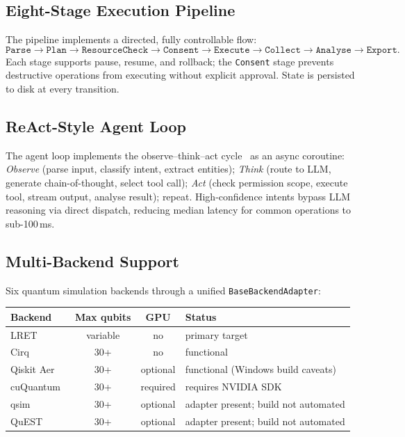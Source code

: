\documentclass[11pt,a4paper]{article}
\begin{document}
\subsection{Eight-Stage Execution Pipeline}

The pipeline implements a directed, fully controllable flow:
\[
\texttt{Parse} \to \texttt{Plan} \to \texttt{ResourceCheck} \to \texttt{Consent}
\to \texttt{Execute} \to \texttt{Collect} \to \texttt{Analyse} \to \texttt{Export}.
\]
Each stage supports pause, resume, and rollback; the \texttt{Consent} stage prevents
destructive operations from executing without explicit approval. State is persisted
to disk at every transition.

\subsection{ReAct-Style Agent Loop}

The agent loop implements the observe--think--act cycle~\cite{yao2023react} as an
async coroutine: \emph{Observe} (parse input, classify intent, extract entities);
\emph{Think} (route to LLM, generate chain-of-thought, select tool call);
\emph{Act} (check permission scope, execute tool, stream output, analyse result);
repeat. High-confidence intents bypass LLM reasoning via direct dispatch, reducing
median latency for common operations to sub-100\,ms.

\subsection{Multi-Backend Support}

Six quantum simulation backends through a unified \texttt{BaseBackendAdapter}:

\begin{center}
\renewcommand{\arraystretch}{1.2}
\begin{tabular}{@{}lccl@{}}
\toprule
\textbf{Backend} & \textbf{Max qubits} & \textbf{GPU} & \textbf{Status} \\
\midrule
LRET              & variable & no       & primary target \\
Cirq~\cite{cirq}             & 30+      & no       & functional \\
Qiskit Aer~\cite{javadi2024qiskit}       & 30+      & optional & functional (Windows build caveats) \\
cuQuantum~\cite{bayraktar2023cuquantum}  & 30+      & required & requires NVIDIA SDK \\
qsim~\cite{qsim}             & 30+      & optional & adapter present; build not automated \\
QuEST~\cite{jones2019quest}  & 30+      & optional & adapter present; build not automated \\
\bottomrule
\end{tabular}
\end{center}
\end{document}
